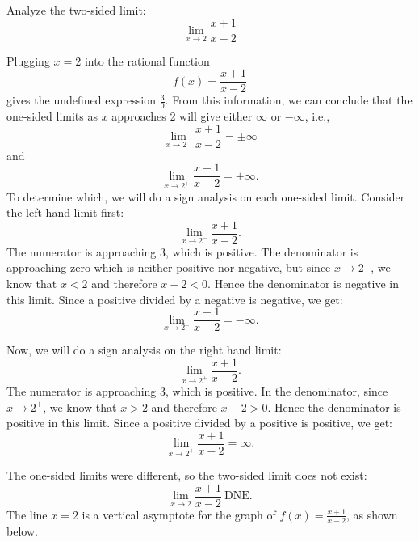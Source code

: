 \documentclass[handout]{ximera}
\begin{document}
\begin{example}[example 3]

Analyze the two-sided limit:
\[
\lim_{x\to 2} 
\frac{x + 1}{x-2}
\]

Plugging $x = 2$ into the rational function
\[f(x) = \frac{x + 1}{x-2}\]
gives the undefined expression $\frac{3}{0}$. From this information, we can conclude that the 
one-sided limits as $x$ approaches 2
will give either $\infty$ or $-\infty$, i.e., 
\[\lim_{x \to 2^-} \frac{x+1}{x-2}= \pm \infty\]
and
\[\lim_{x \to 2^+} \frac{x+1}{x-2}= \pm \infty.\]
To determine which, we will do a sign analysis on each one-sided limit. Consider the left hand limit first:
\[\lim_{x \to 2^-} \frac{x+1}{x-2}.\]
The numerator is approaching 3, which is positive. The denominator is approaching zero which is neither 
positive nor negative, but since $x \to 2^-$, we know that $x<2$ and therefore $x-2 <0$.  
Hence the denominator is negative in this limit. Since a positive divided by a 
negative is negative, we get:
\[\lim_{x \to 2^-} \frac{x+1}{x-2}  = -\infty.\]

Now, we will do a sign analysis on the right hand limit:
\[\lim_{x \to 2^+} \frac{x+1}{x-2}.\]
The numerator is approaching 3, which is positive. In the denominator, since $x \to 2^+$, 
we know that $x>2$ and therefore $x-2 >0$.  
Hence the denominator is positive in this limit. Since a positive divided by a 
positive is positive, we get:
\[\lim_{x \to 2^+} \frac{x+1}{x-2} = \infty.\]

The one-sided limits were different, so the two-sided limit does not exist:
\[\lim_{x \to 2} \frac{x+1}{x-2} \ \text{DNE}.\]
The line $x = 2$ is a vertical asymptote for the graph of $f(x) = \frac{x+1}{x-2}$, as shown below.

\begin{center}
\end{center}
\end{example}
\end{document}
